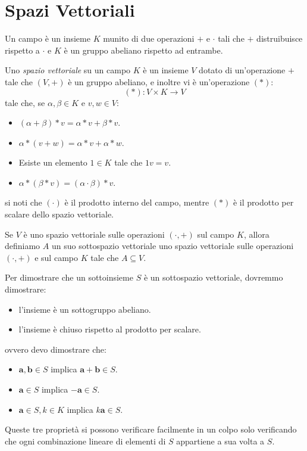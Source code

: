 \documentclass[11pt]{scrartcl}
\begin{document}
	\section{Spazi Vettoriali}
	\begin{definition}[campo]
		Un campo è un insieme $K$ munito di due operazioni $+$ e $\cdot$ tali che $+$ distruibuisce rispetto a $\cdot$ e $K$ è un gruppo abeliano rispetto ad entrambe.
	\end{definition}
	\begin{definition}
		Uno \textit{spazio vettoriale} su un campo $K$ è un insieme $V$ dotato di un'operazione $+$ tale che $(V,+)$ è un gruppo abeliano, e inoltre vi è un'operazione $(*)$:
		$$(*):V\times K \to V$$
		tale che, se $\alpha,\beta\in K$ e $v,w\in V$:
		\begin{itemize}
			\item $(\alpha+\beta)*v=\alpha*v + \beta*v$.
			\item $\alpha*(v+w)= \alpha*v + \alpha*w$.
			\item Esiste un elemento $1\in K$ tale che $1v=v$.
			\item $\alpha*(\beta *v)=(\alpha \cdot \beta)*v$.
		\end{itemize}
		si noti che $(\cdot)$ è il prodotto interno del campo, mentre $(*)$ è il prodotto per scalare dello spazio vettoriale.
	\end{definition}
	\begin{definition}
		Se $V$ è uno spazio vettoriale sulle operazioni $(\cdot,+)$ sul campo $K$, allora definiamo $A$ un suo sottospazio vettoriale uno spazio vettoriale sulle operazioni $(\cdot,+)$ e sul campo $K$ tale che $A \subseteq V$.
	\end{definition}
	\begin{remark}
		Per dimostrare che un sottoinsieme $S$ è un sottospazio vettoriale, dovremmo dimostrare:
		\begin{itemize}
			\item l'insieme è un sottogruppo abeliano.
			\item l'insieme è chiuso rispetto al prodotto per scalare.
		\end{itemize}
		ovvero devo dimostrare che:
		\begin{itemize}
			\item $\mathbf{a},\mathbf{b}\in S$ implica $\mathbf{a}+\mathbf{b}\in S$.
			\item $\mathbf{a}\in S$ implica $-\mathbf{a}\in S$.
			\item $\mathbf{a}\in S,k\in K$ implica $k\mathbf{a}\in S$.
		\end{itemize}
		Queste tre proprietà si possono verificare facilmente in un colpo solo verificando che ogni combinazione lineare di elementi di $S$ appartiene a sua volta a $S$.
	\end{remark}
\end{document}
